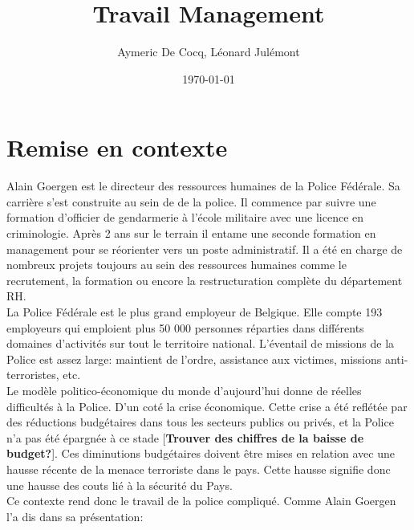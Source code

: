 \documentclass[12pt]{article}
\title{Travail Management}
\author{Aymeric De Cocq, Léonard Julémont}
\date{\today}
\begin{document}
\maketitle

\section{Remise en contexte}


Alain Goergen est le directeur des ressources humaines de la Police Fédérale. Sa carrière s'est construite au sein de de la police. Il commence par suivre une formation d'officier de gendarmerie à l'école militaire avec une licence en criminologie. Après 2 ans sur le terrain il entame une seconde formation en management pour se réorienter vers un poste administratif. Il a été en charge de nombreux projets toujours au sein des ressources humaines comme le recrutement, la formation ou encore la restructuration complète du département RH.\\

La Police Fédérale est le plus grand employeur de Belgique. Elle compte 193 employeurs qui emploient plus 50 000 personnes réparties dans différents domaines d'activités sur tout le territoire national. L'éventail de missions de la Police est assez large: maintient de l'ordre, assistance aux victimes, missions anti-terroristes, etc.\\


Le modèle politico-économique du monde d'aujourd'hui donne de réelles difficultés à la Police. D'un coté la crise économique. Cette crise a été reflétée par des réductions budgétaires dans tous les secteurs publics ou privés, et la Police n'a pas été épargnée à ce stade [\textbf{Trouver des chiffres de la baisse de budget?}]. Ces diminutions budgétaires doivent être mises en relation avec une hausse récente de la menace terroriste dans le pays. Cette hausse signifie donc une hausse des couts lié à la sécurité du Pays. \\
Ce contexte rend donc le travail de la police compliqué. Comme Alain Goergen l'a dis dans sa présentation:
\end{document}
